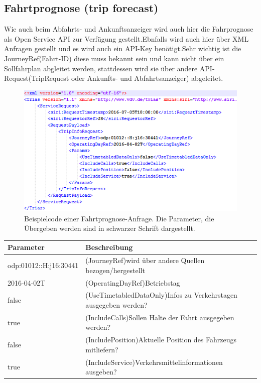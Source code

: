 \subsection{Fahrtprognose (trip forecast)}%
\label{sec:Fahrtprognose}
Wie auch beim Abfahrts- und Ankunftsanzeiger wird auch hier die Fahrprognose als Open Service API zur Verfügung gestellt.Ebnfalls wird auch hier über XML Anfragen gestellt und es wird auch ein API-Key benötigt.Sehr wichtig ist die JourneyRef(Fahrt-ID) diese muss bekannt sein und kann nicht über ein Sollfahrplan abgleitet werden, stattdessen wird sie über andere API-Request(TripRequest oder Ankunfts- und Abfahrtsanzeiger) abgeleitet.\cite{fahrtprognose}

\begin{figure}[]
	\centering
	\includegraphics[width=12cm]{img/bspAbfrageFahrprognose.png}
	\caption{Beispielcode einer Fahrtprognose-Anfrage. Die Parameter, die Übergeben werden sind in schwarzer Schrift dargestellt.\cite{fahrtprognose}}
	\label{fig:Beispiel Anfrage Fahrtprognose}
\end{figure}

\begin{tabular}{|l|l|}  \hline
	Parameter & Beschreibung \\ \hline
	odp:01012::H:j16:30441& (JourneyRef)wird über andere Quellen bezogen/hergestellt   \\ \hline
	2016-04-02T & (OperatingDayRef)Betriebstag \\ \hline
	false & (UseTimetabledDataOnly)Infos zu Verkehrstagen ausgegeben werden? \\ \hline
	true & (IncludeCalls)Sollen Halte der Fahrt ausgegeben werden?   \\ \hline
	false & (IncludePosition)Aktuelle Position des Fahrzeugs mitliefern? \\ \hline	
	true & (IncludeService)Verkehrsmittelinformationen ausgeben? \\ \hline
\end{tabular}
